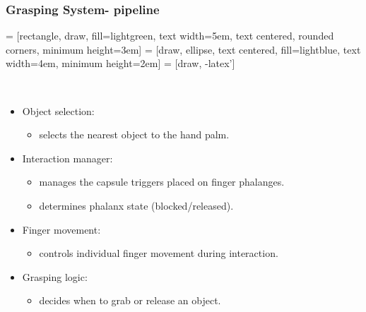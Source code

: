 \documentclass{beamer}
\theoremstyle{remark}
\theoremstyle{plain}
\begin{document}
\begin{frame}
\frametitle{Grasping System- pipeline}


 = [rectangle, draw, fill=lightgreen, 
text width=5em, text centered, rounded corners, minimum height=3em]
 = [draw, ellipse, text centered, fill=lightblue, text width=4em,
minimum height=2em]
 = [draw, -latex']

\begin{figure}[!t]
	\centering
	$  $
	\label{fig:pipeline}
\end{figure}

\begin{itemize}
	\item Object selection: 
	\begin{itemize}
		\item selects the nearest object to the hand palm.
	\end{itemize}
	\item Interaction manager: 
	\begin{itemize}
		\item manages the capsule triggers placed on finger phalanges.
		\item determines phalanx state (blocked/released).	
	\end{itemize}
	\item Finger movement: 
	\begin{itemize}
		\item controls individual finger movement during interaction.
	\end{itemize}
	\item Grasping logic:
	\begin{itemize}
		\item decides when to grab or release an object.
	\end{itemize}
\end{itemize}

\end{frame}
\end{document}
